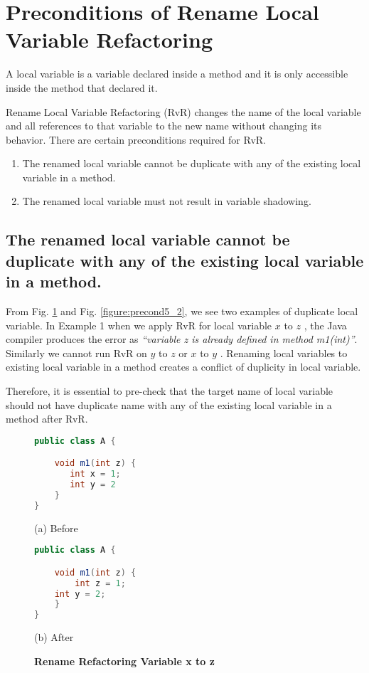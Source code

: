 \section{\textbf{Preconditions of Rename Local Variable Refactoring}}
A local variable is a variable declared inside a method and it is only accessible inside the method that declared it.

Rename Local Variable Refactoring (RvR) changes the name of the local variable and all references to that variable to the new name without changing its behavior. There are certain preconditions required for RvR.
\begin{enumerate}
\item The renamed local variable cannot be duplicate with any of the existing local variable in a method.
\item The renamed local variable must not result in variable shadowing.
\end{enumerate}

\subsection{The renamed local variable cannot be duplicate with any of the existing local variable in a method.}
 
From Fig. \ref{figure:precond5_1} and Fig. \ref{figure:precond5_2}, we see two examples of duplicate local variable. In Example 1 when we apply RvR for local variable $x$ to $z$ , the Java compiler produces the error as \textit{``variable z is already defined in method m1(int)''}. Similarly we cannot run RvR on $y$ to $z$ or $x$  to $y$ . Renaming local variables to existing local variable in a method creates a conflict of duplicity in local variable.

Therefore, it is essential to pre-check that the target name of local variable should not have duplicate name with any of the existing local variable in a method after RvR.

\begin{figure}[th]
\centering
\begin{minipage}[t]{0.4\linewidth}
\begin{lstlisting}[language=java, basicstyle=\scriptsize\ttfamily,frame=single]
public class A {

    void m1(int z) {
       int x = 1; 
       int y = 2
    }
}
\end{lstlisting}
\centering(a) Before
\end{minipage}
\hfill
\begin{minipage}[t]{0.4\linewidth}
\begin{lstlisting}[language=java, basicstyle=\scriptsize\ttfamily,frame=single]
public class A {

    void m1(int z) {
        int z = 1; 
	int y = 2;
    }
}
\end{lstlisting}
\centering(b) After 
\end{minipage}
\caption{\textbf{Rename Refactoring Variable x to z}}
\label{figure:precond5_1}
\end{figure}

